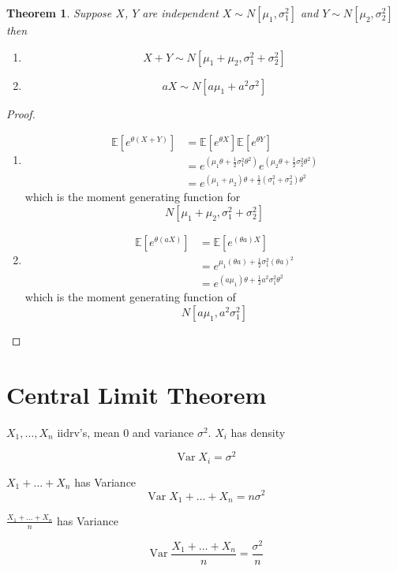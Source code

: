 \documentclass{notes}
\theoremstyle{plain}
\newtheorem{theorem}{Theorem}[chapter]
\newcommand{\bE}{\mathbb{E}}
\newcommand{\expect}[1]{\bE\!\left[#1\right]}
\DeclareMathOperator{\var}{Var}
\begin{document}
\begin{theorem}
Suppose $X$, $Y$ are independent $X\sim N[\mu_1,\sigma_1^2]$ and
$Y\sim  N[\mu_2,\sigma_2^2]$ then
\begin{enumerate}
\item 
\[
X+Y \sim N[\mu_1 +\mu_2, \sigma_1^2 +\sigma_2^2]
\]
\item
\[
aX \sim N[a\mu_1 +a^2\sigma^2]
\]
\end{enumerate} 
\end{theorem}
\begin{proof}
\begin{enumerate}
\item
\begin{align*}
\expect{e^{\theta(X+Y)}} &= \expect{e^{\theta X}}\expect{e^{\theta
      Y}}\\
&= e^{(\mu_1\theta +\frac{1}{2}\sigma_1^2\theta^2)}
e^{(\mu_2\theta +\frac{1}{2}\sigma_2^2\theta^2)}\\
&= e^{(\mu_1+\mu_2)\theta +\frac{1}{2}(\sigma_1^2 +\sigma_2^2)\theta^2}
\end{align*}
which is the moment generating function for
\[
N[\mu_1 +\mu_2, \sigma_1^2 +\sigma_2^2]
\]
\item
\begin{align*}
\expect{e^{\theta(aX)}} &= \expect{e^{(\theta a)X}}\\
&= e^{\mu_1(\theta a) + \frac{1}{2}\sigma_1^2(\theta a)^2}\\
&= e^{(a\mu_1)\theta +\frac{1}{2}a^2\sigma_1^2\theta^2}
\end{align*}
which is the moment generating function of
\[
N[a\mu_1 , a^2\sigma_1^2]
\]
\end{enumerate}
\end{proof}

\section{Central Limit Theorem}
$X_1,\dots,X_n$ iidrv's, mean $0$ and variance $\sigma^2$.  $X_i$
has density

\vspace{2in}

\[
\var{X_i} = \sigma^2
\]


$X_1+\dots+X_n$ has Variance
\[
\var{X_1+\dots+X_n} = n \sigma^2
\]

\vspace{2in}

$\frac{X_1+\dots+X_n}{n}$ has Variance

\[
\var{\frac{X_1+\dots+X_n}{n}} = \frac{\sigma^2}{n}
\]
\end{document}

